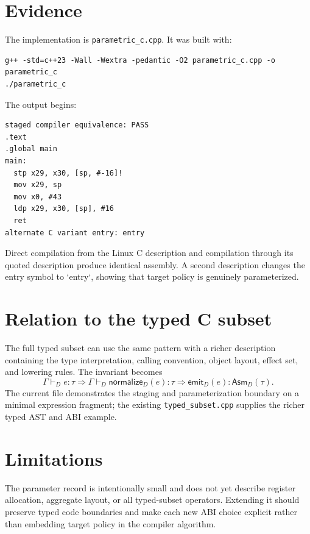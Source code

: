 \documentclass[11pt,a4paper]{article}
\begin{document}
\section{Evidence}
The implementation is \texttt{parametric\_c.cpp}. It was built with:
\begin{verbatim}
g++ -std=c++23 -Wall -Wextra -pedantic -O2 parametric_c.cpp -o parametric_c
./parametric_c
\end{verbatim}
The output begins:
\begin{verbatim}
staged compiler equivalence: PASS
.text
.global main
main:
  stp x29, x30, [sp, #-16]!
  mov x29, sp
  mov x0, #43
  ldp x29, x30, [sp], #16
  ret
alternate C variant entry: entry
\end{verbatim}
Direct compilation from the Linux C description and compilation through its quoted description produce identical assembly. A second description changes the entry symbol to `entry`, showing that target policy is genuinely parameterized.

\section{Relation to the typed C subset}
The full typed subset can use the same pattern with a richer description containing the type interpretation, calling convention, object layout, effect set, and lowering rules. The invariant becomes
\[
\Gamma\vdash_D e:\tau
\Longrightarrow
\Gamma\vdash_D\mathsf{normalize}_D(e):\tau
\Longrightarrow
\mathsf{emit}_D(e):\mathsf{Asm}_D(\tau).
\]
The current file demonstrates the staging and parameterization boundary on a minimal expression fragment; the existing \texttt{typed\_subset.cpp} supplies the richer typed AST and ABI example.

\section{Limitations}
The parameter record is intentionally small and does not yet describe register allocation, aggregate layout, or all typed-subset operators. Extending it should preserve typed code boundaries and make each new ABI choice explicit rather than embedding target policy in the compiler algorithm.
\end{document}
